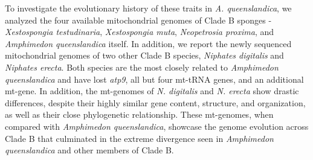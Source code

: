 \documentclass[../main.tex]{subfiles}
\begin{document}
To investigate the evolutionary history of these traits in \emph{A. queenslandica}, we analyzed the four available mitochondrial genomes of Clade B sponges - \emph{Xestospongia testudinaria}, \emph{Xestospongia muta}, \emph{Neopetrosia proxima}, and \emph{Amphimedon queenslandica} itself. In addition, we report the newly sequenced mitochondrial genomes of two other Clade B species, \emph{Niphates digitalis} and \emph{Niphates erecta}. Both species are the most closely related to \emph{Amphimedon queenslandica} and have lost \emph{atp9}, all but four mt-tRNA genes, and an additional mt-gene. In addition, the mt-genomes of \emph{N. digitalis} and \emph{N. erecta} show drastic differences, despite their highly similar gene content, structure, and organization, as well as their close phylogenetic relationship. These mt-genomes, when compared with \emph{Amphimedon queenslandica}, showcase the genome evolution across Clade B that culminated in the extreme divergence seen in \emph{Amphimedon queenslandica} and other members of Clade B.
\end{document}
